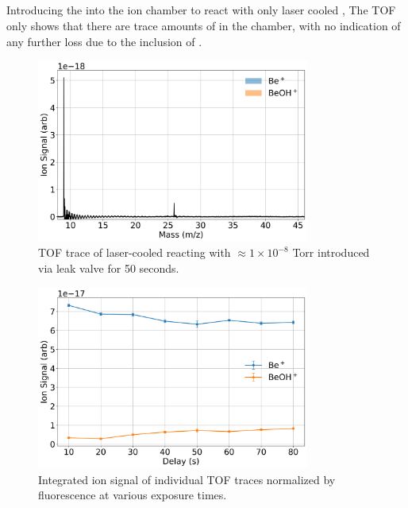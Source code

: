 \subsection{}
Introducing the  into the ion chamber to react with only laser cooled , The TOF only shows that there are trace amounts of  in the chamber, with no indication of any further loss due to the inclusion of .

\begin{figure}[H]
	\label{fig: Be+CO2 TOF}
	\centering
	\includegraphics[width=0.8\textwidth]{images/Be_CO2_TOF.png}
	\caption{TOF trace of laser-cooled  reacting with $\approx 1 \times 10^{-8}$ Torr  introduced via leak valve for 50 seconds.}
\end{figure}

\begin{figure}[H]
	\label{fig: Be+CO2 traces}
	\centering
	\includegraphics[width=0.8\textwidth]{images/Be_CO2_traces.png}
	\caption{Integrated ion signal of individual TOF traces normalized by  fluorescence at various  exposure times.}
\end{figure}


